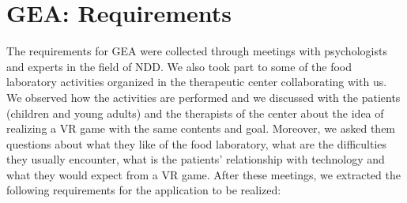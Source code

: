\documentclass{sigchi-ext}
\begin{document}
\section{GEA: Requirements}
The requirements for GEA were collected through meetings with psychologists and experts in the field of NDD. We also took part to some of the food laboratory activities organized in the therapeutic center collaborating with us. We observed how the activities are performed and we discussed with the patients (children and young adults) and the therapists of the center about the idea of realizing a VR game with the same contents and goal. Moreover, we asked them questions about what they like of the food laboratory, what are the difficulties they usually encounter, what is the patients’ relationship with technology and what they would expect from a VR game. After these meetings, we extracted the following requirements for the application to be realized:
\end{document}
